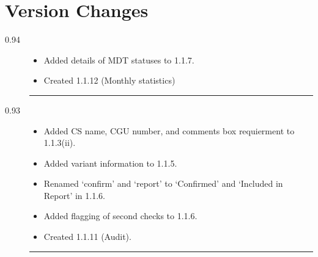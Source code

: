 \documentclass[a4paper, 10pt]{article}
\begin{document}
\newpage


\section{Version Changes}
\begin{description}
            \item [0.94] \begin{itemize}
                                \renewcommand\labelitemi{--}
                                        \item Added details of MDT statuses to 1.1.7.
                                                    \item Created 1.1.12 (Monthly statistics)
                                                            \end{itemize}
                                                                \rule{\textwidth}{1pt}
                                                                    \item [0.93] \begin{itemize}
                                                                                        \renewcommand\labelitemi{--}
                                                                                                \item Added CS name, CGU number, and comments box requierment to 1.1.3(ii).
                                                                                                            \item Added variant information to 1.1.5.
                                                                                                                        \item Renamed `confirm' and `report' to `Confirmed' and `Included in Report' in 1.1.6.
                                                                                                                                    \item Added flagging of second checks to 1.1.6.
                                                                                                                                                \item Created 1.1.11 (Audit).
                                                                                                                                                        \end{itemize}
                                                                                                                                                            \rule{\textwidth}{1pt}

\end{description}
\end{document}
